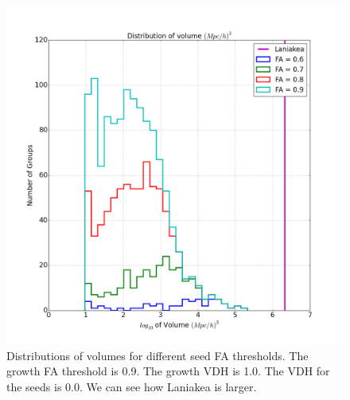 \documentclass[12pt]{article}
\begin{document}
\begin{figure}[ht]
\centering
  \includegraphics[width=1.1\textwidth]{groups/volumes_distr_Mpc_laniakea_all_histstep_growth_90.png}
\caption{Distributions of volumes for different seed FA thresholds. The growth FA threshold is 0.9. The growth VDH is 1.0. The VDH for the seeds is 0.0. We can see how Laniakea is larger.} \label{fg:compare_lan_larg}
\end{figure}
\FloatBarrier
\end{document}
